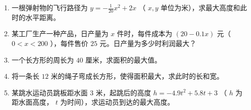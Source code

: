 \begin{practice}


\begin{enumerate}
  \item 一根弹射物的飞行路径为 $y = -\frac{1}{20}x^2 + 2x$ （ $x, y$ 单位为米），求最大高度和此时的水平距离。
  \item 某工厂生产一种产品，日产量为 $x$ 件时，每件成本为 $(20 - 0.1x)$ 元（ $0 < x < 200$ ），每件售价 $25$ 元。日产量为多少时利润最大？
  \item 一个长方形的周长为 $40$ 厘米，求面积的最大值。
  \item 将一条长 $12$ 米的绳子弯成长方形，使得面积最大，求此时的长和宽。
  \item 某跳水运动员跳板距水面 $3$ 米，起跳后的高度 $h = -4.9t^2 + 5.8t + 3$ （ $h$ 为距水面高度， $t$ 为时间），求运动员到达的最大高度。
\end{enumerate}


\end{practice}



